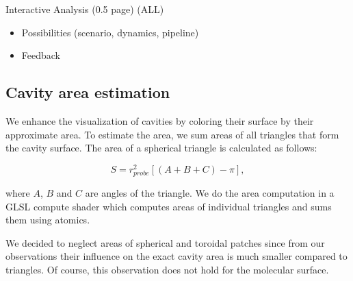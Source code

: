 Interactive Analysis (0.5 page) (ALL)
\begin{itemize}
  \item Possibilities (scenario, dynamics, pipeline)
  \item Feedback
\end{itemize}

\subsection{Cavity area estimation}

We enhance the visualization of cavities by coloring their surface by their approximate area.
To estimate the area, we sum areas of all triangles that form the cavity surface.
The area of a spherical triangle is calculated as follows:

\begin{equation}
  S = r_{probe}^2 \left[ \left( A + B + C \right) - \pi \right],
\end{equation}

where $A$, $B$ and $C$ are angles of the triangle. We do the area computation in a GLSL compute shader which computes areas of individual triangles and sums them using atomics.

We decided to neglect areas of spherical and toroidal patches since from our observations their influence on the exact cavity area is much smaller compared to triangles.
Of course, this observation does not hold for the molecular surface.
